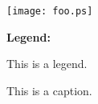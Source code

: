 \documentclass{article}
\newcommand{\stylelegendtitle}[1]{{\bf #1:}}
\begin{document}
\begin{figure}
\centerline{\texttt{[image: foo.ps]}}
\stylelegendtitle{Legend}

This is a legend.
\caption{This is a caption.
}
\end{figure}
\end{document}
